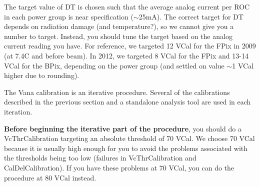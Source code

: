 The target value of DT is chosen such that the average analog current per ROC in each power group is near specification ($\sim$25mA). The correct target for DT depends on radiation damage (and temperature?), so we cannot give you a number to target. Instead, you should tune the target based on the analog current reading you have. For reference, we targeted 12 VCal for the FPix in 2009  (at 7.4C and before beam). In 2012, we targeted 8 VCal for the FPix and 13-14 VCal for the BPix, depending on the power group (and settled on value $\sim$1 VCal higher due to rounding).  
 
The Vana calibration is an iterative procedure. Several of the calibrations described in the previous section and a standalone analysis tool are used in each iteration.

{\bf Before beginning the iterative part of the procedure}, you should do a VcThrCalibration targeting
an absolute threshold of 70 VCal.  We choose 70 VCal because it is usually high enough for you
to avoid the problems associated with the thresholds being too low (failures in VcThrCalibration
and CalDelCalibration).  If you have these problems
at 70 VCal, you can do the procedure at 80 VCal instead.

